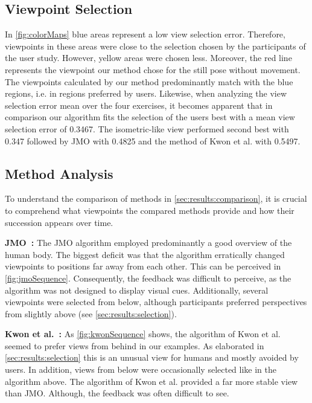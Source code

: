 \subsection{Viewpoint Selection \label{sec:results:selection}}
In \autoref{fig:colorMaps} blue areas represent a low view selection error. Therefore, viewpoints in these areas were close to the selection chosen by the participants of the user study. However, yellow areas were chosen less. Moreover, the red line represents the viewpoint our method chose for the still pose without movement.
The viewpoints calculated by our method predominantly match with the blue regions, i.e. in regions preferred by users. Likewise, when analyzing the view selection error mean over the four exercises, it becomes apparent that in comparison our algorithm fits the selection of the users best with a mean view selection error of 0.3467. The isometric-like view performed second best with 0.347 followed by JMO with 0.4825 and the method of Kwon et al. with 0.5497.

\subsection{Method Analysis\label{sec:results:analyis}}
To understand the comparison of methods in \autoref{sec:results:comparison}, it is crucial to comprehend what viewpoints the compared methods provide and how their succession appears over time.

\textbf{JMO~\cite{ishara2015mra}:}
The JMO algorithm employed predominantly a good overview of the human body. The biggest deficit was that the algorithm erratically changed viewpoints to positions far away from each other. This can be perceived in \autoref{fig:jmoSequence}. Consequently, the feedback was difficult to perceive, as the algorithm was not designed to display visual cues. Additionally, several viewpoints were selected from below, although participants preferred perspectives from slightly above (see \autoref{sec:results:selection}).

\textbf{Kwon et al.~\cite{kwon2020ocp}:} 
As \autoref{fig:kwonSequence} shows, the algorithm of Kwon et al. seemed to prefer views from behind in our examples. As elaborated in \autoref{sec:results:selection} this is an unusual view for humans and mostly avoided by users. In addition, views from below were occasionally selected like in the algorithm above. The algorithm of Kwon et al. provided a far more stable view than JMO. Although, the feedback was often difficult to see.

